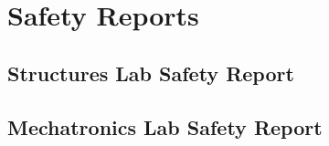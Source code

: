 \chapter{Safety Reports}

\section{Structures Lab Safety Report}



\section{Mechatronics Lab Safety Report}


